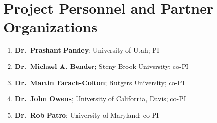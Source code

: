 
\section*{Project Personnel and Partner Organizations}
\vspace{0.1in}
\noindent
\begin{enumerate}
\item \textbf{Dr.\ Prashant Pandey}; University of Utah; PI
\item \textbf{Dr.\ Michael A. Bender}; Stony Brook University; co-PI
\item \textbf{Dr.\ Martin Farach-Colton}; Rutgers University; co-PI
\item \textbf{Dr.\ John Owens}; University of California, Davis; co-PI
\item \textbf{Dr.\ Rob Patro}; University of 
Maryland; co-PI
\end{enumerate}
